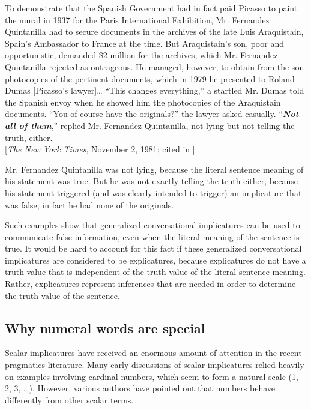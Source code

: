 \ea \label{ex:9.22}
  To demonstrate that the Spanish Government had in fact paid Picasso to paint the mural in 1937 for the Paris International Exhibition, Mr. Fernandez Quintanilla had to secure documents in the archives of the late Luis Araquistain, Spain’s Ambassador to France at the time. But Araquistain’s son, poor and opportunistic, demanded \$2 million for the archives, which Mr. Fernandez Quintanilla rejected as outrageous. He managed, however, to obtain from the son photocopies of the pertinent documents, which in 1979 he presented to Roland Dumas [Picasso’s lawyer]… “This changes everything,” a startled Mr. Dumas told the Spanish envoy when he showed him the photocopies of the Araquistain documents. “You of course have the originals?” the lawyer asked casually. “\textbf{\textit{Not all of them}},” replied Mr. Fernandez Quintanilla, not lying but not telling the truth, either.\\
   {}[\textit{The New York Times}, November 2, 1981; cited in \citealt{Horn1992}]
\z


Mr. Fernandez Quintanilla was not lying, because the literal sentence meaning of his statement was true. But he was not exactly telling the truth either, because his statement triggered (and was clearly intended to trigger) an implicature that was false; in fact he had none of the originals.



Such examples show that generalized conversational implicatures can be used to communicate false information, even when the literal meaning of the sentence is true. It would be hard to account for this fact if these generalized conversational implicatures are considered to be explicatures, because explicatures do not have a truth value that is independent of the truth value of the literal sentence meaning. Rather, explicatures represent inferences that are needed in order to determine the truth value of the sentence.


\subsection{Why numeral words are special}\label{sec:} %

Scalar implicatures have received an enormous amount of attention in the recent pragmatics literature. Many early discussions of scalar implicatures relied heavily on examples involving cardinal numbers, which seem to form a natural scale (1, 2, 3, …). However, various authors have pointed out that numbers behave differently from other scalar terms.



